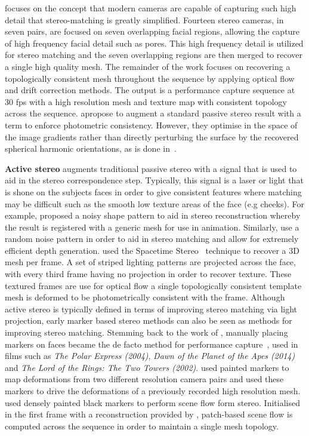 focuses on the concept that modern cameras are capable of capturing such high
detail that stereo-matching is greatly simplified. Fourteen stereo cameras, in
seven pairs, are focused on seven overlapping facial regions, allowing the
capture of high frequency facial detail such as pores. This high frequency
detail is utilized for stereo matching and the seven overlapping regions are
then merged to recover a single high quality mesh. The remainder of the work
focuses on recovering a topologically consistent mesh throughout the sequence by
applying optical flow and drift correction methods. The output is a performance
capture sequence at 30 fps with a high resolution mesh and texture map
with consistent topology across the sequence.
\citet{wu2011high} apropose to augment a standard passive stereo result with
a term to enforce photometric consistency. However, they optimise in the space
of the image gradients rather than directly perturbing the surface by the
recovered spherical harmonic orientations, as is done
in~\cite{nehab2005efficiently}.

\textbf{Active stereo} augments traditional passive stereo with a signal that is
used to aid in the stereo correspondence step. Typically, this signal is a laser
or light that is shone on the subjects faces in order to give consistent
features where matching may be difficult such as the smooth low texture areas of
the face (e.g cheeks). For example, \citet{enciso1999synthesis} proposed a noisy
shape pattern to aid in stereo reconstruction whereby the result is registered
with a generic mesh for use in animation. Similarly, \citet{d2002modeling}
use a random noise pattern in order to aid in stereo matching and allow
for extremely efficient depth generation.
\citet{zhang2004spacetime} used the
Spacetime Stereo~\cite{zhang2003spacetime,davis2005spacetime} technique to
recover a 3D mesh per frame. A set of striped lighting patterns are projected
across the face, with every third frame having no projection in order to recover
texture. These textured frames are use for optical flow a single topologically
consistent template mesh is deformed to be photometrically consistent with the
frame.
Although active stereo is typically defined in terms of improving stereo
matching via light projection, early marker based stereo methods can also be
seen as methods for improving stereo matching.
Stemming back to the work of \citet{williams1990performance}, manually placing
markers on faces became the de facto method for performance
capture~\cite{bickel2007multi,furukawa2009dense,bredow2005mocap},
used in films such as \textit{The Polar Express (2004)},
\textit{Dawn of the Planet of the Apes (2014)} and
\textit{The Lord of the Rings: The Two Towers (2002)}.
\citet{bickel2007multi} used painted markers to map deformations from two
different resolution camera pairs and used these markers to drive the
deformations of a previously recorded high resolution mesh.
\citet{furukawa2009dense} used densely painted black markers to perform
scene flow form stereo. Initialised in the first frame with a reconstruction
provided by \citet{Furu:2010:PMVS}, patch-based scene flow is computed across
the sequence in order to maintain a single mesh topology.

